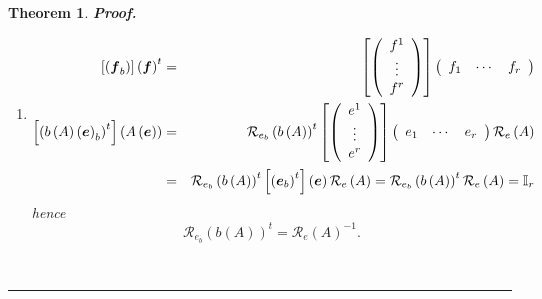 \documentclass[aps,preprint]{revtex4}
\newtheorem{theorem}{Theorem}
\newenvironment{proof}[1][Proof]{\noindent\textbf{#1.} }{\ \rule{0.5em}{0.5em}}
\begin{document}
\begin{theorem}
\begin{proof}
\begin{enumerate}
\item 
\begin{eqnarray}
\left[ \left( \boldsymbol{f}_{b}\right) \right] \left( \boldsymbol{f}\right)
^{t} &=&\left[ \left( 
\begin{array}{c}
f^{1} \\ 
\vdots \\ 
f^{r}%
\end{array}%
\right) \right] \left( 
\begin{array}{ccc}
f_{1} & \cdots & f_{r}%
\end{array}%
\right) \\
\left[ \left( b\left( A\right) \left( \boldsymbol{e}\right) _{b}\right) ^{t}%
\right] \left( A\left( \boldsymbol{e}\right) \right) &=&\mathcal{R}%
_{e_{b}}\left( b\left( A\right) \right) ^{t}\left[ \left( 
\begin{array}{c}
e^{1} \\ 
\vdots \\ 
e^{r}%
\end{array}%
\right) \right] \left( 
\begin{array}{ccc}
e_{1} & \cdots & e_{r}%
\end{array}%
\right) \mathcal{R}_{e}\left( A\right) \\
&=&\mathcal{R}_{e_{b}}\left( b\left( A\right) \right) ^{t}\left[ \overset{}{%
\left( \boldsymbol{e}_{b}\right) ^{t}}\right] \left( \overset{}{\boldsymbol{e%
}}\right) \mathcal{R}_{e}\left( A\right) =\mathcal{R}_{e_{b}}\left( b\left(
A\right) \right) ^{t}\mathcal{R}_{e}\left( A\right) =\mathbb{I}_{r}
\end{eqnarray}%
hence%
\begin{equation}
\mathcal{R}_{e_{b}}\left( b\left( A\right) \right) ^{t}=\mathcal{R}%
_{e}\left( A\right) ^{-1}.
\end{equation}


\end{enumerate}
\end{proof}
\end{theorem}
\end{document}
